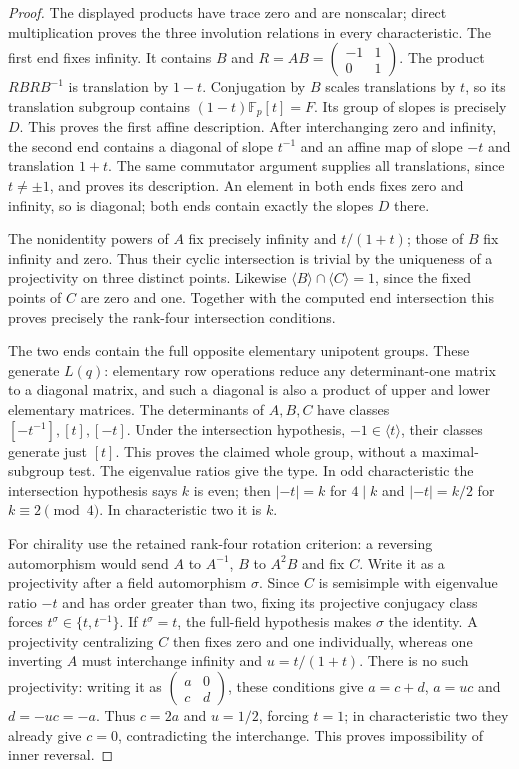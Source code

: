 \begin{proof}
The displayed products have trace zero and are nonscalar; direct
multiplication proves the three involution relations in every characteristic.
The first end fixes infinity. It contains $B$ and
$R=AB=\left(\begin{smallmatrix}-1&1\\0&1\end{smallmatrix}\right)$.
The product $RBRB^{-1}$ is translation by $1-t$. Conjugation by $B$
scales translations by $t$, so its translation subgroup contains
$(1-t)\mathbb F_p[t]=F$. Its group of slopes is precisely $D$.
This proves the first affine description. After interchanging zero and
infinity, the second end contains a diagonal of slope $t^{-1}$ and an
affine map of slope $-t$ and translation $1+t$. The same commutator
argument supplies all translations, since $t\ne\pm1$, and proves its
description. An element in both ends fixes zero and infinity, so is
diagonal; both ends contain exactly the slopes $D$ there.

The nonidentity powers of $A$ fix precisely infinity and $t/(1+t)$;
those of $B$ fix infinity and zero. Thus their cyclic intersection is
trivial by the uniqueness of a projectivity on three distinct points.
Likewise $\langle B\rangle\cap\langle C\rangle=1$, since the fixed
points of $C$ are zero and one. Together with the computed end
intersection this proves precisely the rank-four intersection conditions.

The two ends contain the full opposite elementary unipotent groups.
These generate $L(q)$: elementary row operations reduce any determinant-one
matrix to a diagonal matrix, and such a diagonal is also a product of
upper and lower elementary matrices. The determinants of $A,B,C$ have
classes $[-t^{-1}],[t],[-t]$. Under the intersection hypothesis,
$-1\in\langle t\rangle$, their classes generate just $[t]$.
This proves the claimed whole group, without a maximal-subgroup test.
The eigenvalue ratios give the type. In odd characteristic the intersection
hypothesis says $k$ is even; then $|{-t}|=k$ for $4\mid k$ and
$|{-t}|=k/2$ for $k\equiv2\pmod4$. In characteristic two it is $k$.

For chirality use the retained rank-four rotation criterion: a reversing
automorphism would send $A$ to $A^{-1}$, $B$ to $A^2B$ and fix $C$.
Write it as a projectivity after a field automorphism $\sigma$.
Since $C$ is semisimple with eigenvalue ratio $-t$ and has order greater
than two, fixing its projective conjugacy class forces
$t^\sigma\in\{t,t^{-1}\}$. If $t^\sigma=t$, the full-field hypothesis
makes $\sigma$ the identity. A projectivity centralizing $C$ then fixes
zero and one individually, whereas one inverting $A$ must interchange
infinity and $u=t/(1+t)$. There is no such projectivity: writing it as
$\left(\begin{smallmatrix}a&0\\c&d\end{smallmatrix}\right)$, these
conditions give $a=c+d$, $a=uc$ and $d=-uc=-a$. Thus $c=2a$ and
$u=1/2$, forcing $t=1$; in characteristic two they already give $c=0$,
contradicting the interchange. This proves impossibility of inner reversal.


\end{proof}
